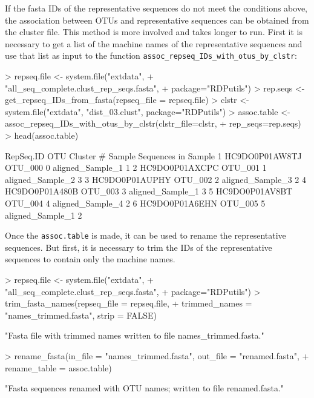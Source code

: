 \documentclass{article}
\begin{document}
If the fasta IDs of the representative sequences do not meet the conditions above, the association between OTUs and representative sequences can be obtained from the cluster file.  This method is more involved and takes longer to run.  First it is necessary to get a list of the machine names of the representative sequences and use that list as input to  the function \texttt{assoc\_repseq\_IDs\_with\_otus\_by\_clstr}:
\begin{Schunk}
\begin{Sinput}
> repseq.file <- system.file("extdata", 
+                            "all_seq_complete.clust_rep_seqs.fasta", 
+                            package="RDPutils")
> rep.seqs <- get_repseq_IDs_from_fasta(repseq_file = repseq.file)
> clstr <- system.file("extdata", "dist_03.clust", package="RDPutils")
> assoc.table <- assoc_repseq_IDs_with_otus_by_clstr(clstr_file=clstr, 
+                                                    rep_seqs=rep.seqs)
> head(assoc.table)
\end{Sinput}
\begin{Soutput}
       RepSeq.ID     OTU Cluster #           Sample Sequences in Sample
1 HC9DO0P01AW8TJ OTU_000         0 aligned_Sample_1                   1
2 HC9DO0P01AXCPC OTU_001         1 aligned_Sample_2                   3
3 HC9DO0P01AUPHY OTU_002         2 aligned_Sample_3                   2
4 HC9DO0P01A480B OTU_003         3 aligned_Sample_1                   3
5 HC9DO0P01AV8BT OTU_004         4 aligned_Sample_4                   2
6 HC9DO0P01A6EHN OTU_005         5 aligned_Sample_1                   2
\end{Soutput}
\end{Schunk}
Once the \texttt{assoc.table} is made, it can be used to rename the representative sequences.  But first, it is necessary to trim the IDs of the representative sequences to contain only the machine names.
\begin{Schunk}
\begin{Sinput}
> repseq.file <- system.file("extdata", 
+                            "all_seq_complete.clust_rep_seqs.fasta", 
+                            package="RDPutils")
> trim_fasta_names(repseq_file = repseq.file, 
+                  trimmed_names = "names_trimmed.fasta", strip = FALSE)
\end{Sinput}
\begin{Soutput}
[1] "Fasta file with trimmed names written to file names_trimmed.fasta."
\end{Soutput}
\begin{Sinput}
> rename_fasta(in_file = "names_trimmed.fasta", out_file = "renamed.fasta", 
+              rename_table = assoc.table)
\end{Sinput}
\begin{Soutput}
[1] "Fasta sequences renamed with OTU names; written to file renamed.fasta."
\end{Soutput}
\end{Schunk}
\end{document}
